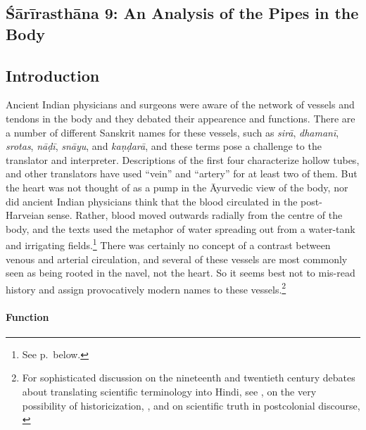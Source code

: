 \begin{refsection} 
\chapter{Śārīrasthāna 9:  An Analysis of the Pipes in the Body}

\setcounter{footnote}{0}

\section{Introduction}

%
%
%
%
%
%

Ancient Indian physicians and surgeons were aware of the network of
vessels and tendons in the body and they debated their appearence and
functions. There are a number of different Sanskrit names for these
vessels, such as \emph{sirā}, \emph{dhamanī}, \emph{srotas},
\emph{nāḍī}, \emph{snāyu}, and \emph{kaṇḍarā}, and these terms pose a
challenge to the translator and interpreter.  Descriptions of the
first four characterize hollow tubes, and other translators have used
“vein” and “artery” for at least two of them.  But the heart was not
thought of as a pump in the Āyurvedic view of the body, nor did
ancient Indian physicians think that the blood circulated in the
post-Harveian sense. Rather, blood moved outwards radially from the
centre of the body, and the texts used the metaphor of water spreading out from a water-tank and irrigating fields.\footnote{See p.\,\pageref{fields} below.} 
There was certainly no concept of a contrast between venous and
arterial circulation, and several of these vessels are most commonly
seen as being rooted in the navel, not the heart.  So it seems best
not to mis-read history and assign provocatively modern names to these vessels.\footnote{For sophisticated discussion on the nineteenth and twentieth century debates about translating scientific terminology into Hindi, see \cite{sing-2021,gure-2020,gure-2022}, on the very possibility of historicization, \cite{mukh-2020}, and on scientific truth in  postcolonial discourse, \cite{gure-2020}}

\subsubsection{Function}


\end{refsection}
